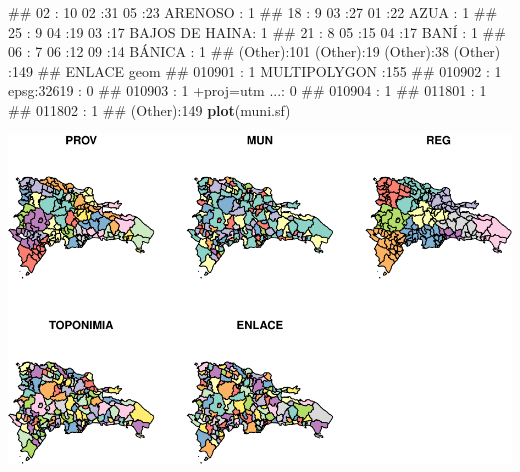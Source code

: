 \documentclass[11pt,]{article}
\newenvironment{Shaded}{\begin{snugshade}}{\end{snugshade}}
\newcommand{\KeywordTok}[1]{\textcolor[rgb]{0.13,0.29,0.53}{\textbf{#1}}}
\newcommand{\NormalTok}[1]{#1}
\begin{document}
\begin{Shaded}
\begin{Highlighting}[]
\NormalTok{##  02     : 10   02     :31   05     :23   ARENOSO       :  1  }
\NormalTok{##  18     :  9   03     :27   01     :22   AZUA          :  1  }
\NormalTok{##  25     :  9   04     :19   03     :17   BAJOS DE HAINA:  1  }
\NormalTok{##  21     :  8   05     :15   04     :17   BANÍ          :  1  }
\NormalTok{##  06     :  7   06     :12   09     :14   BÁNICA        :  1  }
\NormalTok{##  (Other):101   (Other):19   (Other):38   (Other)       :149  }
\NormalTok{##      ENLACE               geom    }
\NormalTok{##  010901 :  1   MULTIPOLYGON :155  }
\NormalTok{##  010902 :  1   epsg:32619   :  0  }
\NormalTok{##  010903 :  1   +proj=utm ...:  0  }
\NormalTok{##  010904 :  1                      }
\NormalTok{##  011801 :  1                      }
\NormalTok{##  011802 :  1                      }
\NormalTok{##  (Other):149}
\KeywordTok{plot}\NormalTok{(muni.sf)}
\end{Highlighting}
\end{Shaded}

\includegraphics[width=1\linewidth]{img/unnamed-chunk-2-1}
\end{document}
